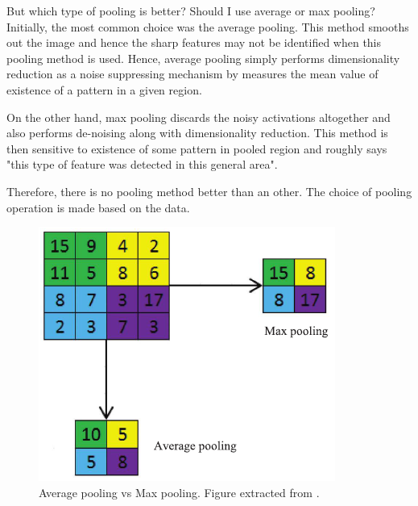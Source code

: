 \documentclass[11pt, openany]{report}
\theoremstyle{plain}
\theoremstyle{definition}
\theoremstyle{remark}
\begin{document}
But which type of pooling is better? Should I use average or max pooling? Initially, the most common choice was the average pooling. This method smooths out the image and hence the sharp features may not be identified when this pooling method is used. Hence, average pooling simply performs dimensionality reduction as a noise suppressing mechanism by measures the mean value of existence of a pattern in a given region. 

On the other hand, max pooling discards the noisy activations altogether and also performs de-noising along with dimensionality reduction. This method is then sensitive to existence of some pattern in pooled region and roughly says "this type of feature was detected in this general area".

Therefore, there is no pooling method better than an other. The choice of pooling operation is made based on the data.  

\begin{figure}[h]
  \centering
  \includegraphics[scale=0.7]{figures/averageVSmaxPOOLING.png}
  \caption{Average pooling vs Max pooling. Figure extracted from \citep{CNN-1}.}
  \label{fig:avgVSmaxPOOLING}
\end{figure}

\newpage
\end{document}
